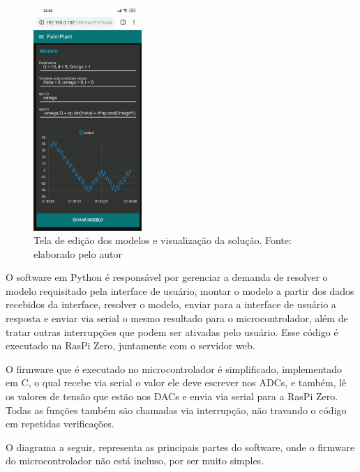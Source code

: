 \documentclass[journal]{IEEEtranTIE}
\begin{document}
\begin{figure}[H]
	\centering
	\includegraphics[width=4.1cm]{img/running.png}
    \caption{Tela de edição dos modelos e visualização da solução. Fonte: elaborado pelo autor}
    \label{fig:running}
\end{figure}

O software em Python é responsável por gerenciar a demanda de resolver o modelo requisitado pela interface de usuário, montar o modelo a partir dos dados recebidos da interface, resolver o modelo, enviar para a interface de usuário a resposta e enviar via serial o mesmo resultado para o microcontrolador, além de tratar outras interrupções que podem ser ativadas pelo usuário. Esse código é executado na RasPi Zero, juntamente com o servidor web.

O firmware que é executado no microcontrolador é simplificado, implementado em C, o qual recebe via serial o valor ele deve escrever nos ADCs, e também, lê os valores de tensão que estão nos DACs e envia via serial para a RasPi Zero. Todas as funções também são chamadas via interrupção, não travando o código em repetidas verificações.

O diagrama a seguir, representa as principais partes do software, onde o firmware do microcontrolador não está incluso, por ser muito simples.
\end{document}
